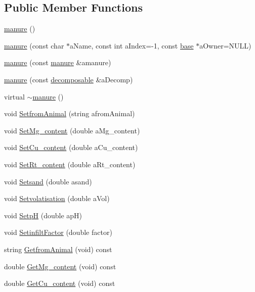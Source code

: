 \subsection*{Public Member Functions}
\begin{DoxyCompactItemize}
\item 
\hyperlink{classmanure_a169ecc5b27034bb777db79053f571c6e}{manure} ()
\item 
\hyperlink{classmanure_a38f96dbe471887e6846f2435209bce64}{manure} (const char $\ast$aName, const int aIndex=-\/1, const \hyperlink{classbase}{base} $\ast$aOwner=NULL)
\item 
\hyperlink{classmanure_afbb8c5beb0e7ac02c565f8d754a05558}{manure} (const \hyperlink{classmanure}{manure} \&amanure)
\item 
\hyperlink{classmanure_a46c220944c99cbd781019f206233bf32}{manure} (const \hyperlink{classdecomposable}{decomposable} \&aDecomp)
\item 
virtual \hyperlink{classmanure_ac1beb68437856daf80d130aa4714cf66}{$\sim$manure} ()
\item 
void \hyperlink{classmanure_add39b3db240608cc79de01d322e01a7a}{SetfromAnimal} (string afromAnimal)
\item 
void \hyperlink{classmanure_ab92a739f5a35221e48c8923af884e3a4}{SetMg\_\-content} (double aMg\_\-content)
\item 
void \hyperlink{classmanure_aa979cd914677628162bbabecb00a292d}{SetCu\_\-content} (double aCu\_\-content)
\item 
void \hyperlink{classmanure_a7fb7695584fe22855f7b1183a97d26d2}{SetRt\_\-content} (double aRt\_\-content)
\item 
void \hyperlink{classmanure_a3a698b8d4b52c4fd14b7731ce20ad57d}{Setsand} (double asand)
\item 
void \hyperlink{classmanure_adefe5e150b1de5ae3c4af36c0c6dcada}{Setvolatisation} (double aVol)
\item 
void \hyperlink{classmanure_a6d4583c874bb537909cfe6c110a59041}{SetpH} (double apH)
\item 
void \hyperlink{classmanure_a4b2a248f98de1f072d5b25d85e0a6641}{SetinfiltFactor} (double factor)
\item 
string \hyperlink{classmanure_ac8976e36d43ce2b5ad75407ce036a317}{GetfromAnimal} (void) const 
\item 
double \hyperlink{classmanure_a33d61ff2bca9b2344ca013d284176395}{GetMg\_\-content} (void) const 
\item 
double \hyperlink{classmanure_af7b3d4f63546db980e899016faeeb500}{GetCu\_\-content} (void) const 

\end{DoxyCompactItemize}
